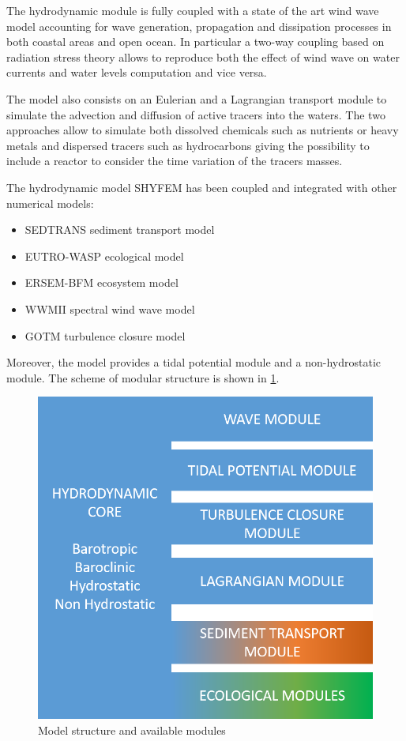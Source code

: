 The hydrodynamic module is fully coupled with a state of the art wind wave model accounting for wave generation, propagation and dissipation processes in both coastal areas and open ocean. In particular a two-way coupling based on radiation stress theory  allows to reproduce both the effect of wind wave on water currents and water levels computation and vice versa.

The model also consists on an Eulerian and a Lagrangian transport module to simulate the advection and diffusion of active tracers into the waters. The two approaches allow to simulate both dissolved chemicals such as nutrients or heavy metals and dispersed tracers such as hydrocarbons giving the possibility to include a reactor to consider the time variation of the tracers masses.

The hydrodynamic model SHYFEM has been coupled and integrated with other numerical models:
\begin{itemize}
 \item   SEDTRANS sediment transport model
 \item   EUTRO-WASP ecological model
 \item  ERSEM-BFM ecosystem model
  \item  WWMII spectral wind wave model
  \item  GOTM turbulence closure model
\end{itemize}

Moreover, the model provides a tidal potential module and a non-hydrostatic module.
The scheme of \shy{} modular structure is shown in \Fig \ref{module}.


\begin{figure}[htbp]
\centering
\includegraphics[scale=0.5]{module_scheme.png}
\caption{Model structure and available modules}
\label{module}
\end{figure}


